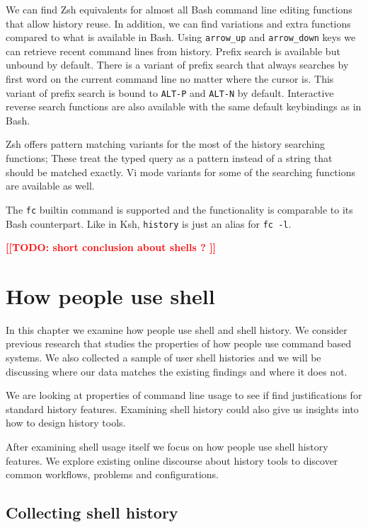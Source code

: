 \documentclass[thesis=M,english]{FITthesis}[2012/10/20]
\newcommand{\todotext}[1]{\textcolor{red}{\textbf{[[#1]]}}}
\newcommand{\blind}[1][1]{\textcolor{mygray}{\Blindtext[#1][1]}}
\begin{document}
We can find Zsh equivalents for almost all Bash command line editing functions that allow history reuse. In addition, we can find variations and extra functions compared to what is available in Bash. Using \verb|arrow_up| and \verb|arrow_down| keys we can retrieve recent command lines from history. Prefix search is available but unbound by default. There is a variant of prefix search that always searches by first word on the current command line no matter where the cursor is. This variant of prefix search is bound to \verb|ALT-P| and \verb|ALT-N| by default. Interactive reverse search functions are also available with the same default keybindings as in Bash.

Zsh offers pattern matching variants for the most of the history searching functions; These treat the typed query as a pattern instead of a string that should be matched exactly. Vi mode variants for some of the searching functions are available as well.  

The \verb|fc| builtin command is supported and the functionality is comparable to its Bash counterpart. Like in Ksh, \verb|history| is just an alias for \verb|fc -l|. 



\blind
\todotext{TODO: short conclusion about shells ? }


\section{How people use shell}

In this chapter we examine how people use shell and shell history. We consider previous research that studies the properties of how people use command based systems. We also collected a sample of user shell histories and we will be discussing where our data matches the existing findings and where it does not. 

We are looking at properties of command line usage to see if find justifications for standard history features. Examining shell history could also give us insights into how to design history tools. 

After examining shell usage itself we focus on how people use shell history features. We explore existing online discourse about history tools to discover common workflows, problems and configurations.

\subsection{Collecting shell history}
\end{document}
